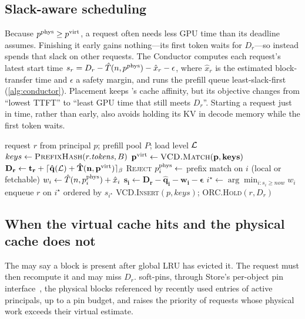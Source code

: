 \subsection{Slack-aware scheduling}
\label{sec:slack}
Because $p^{\mathrm{phys}} \ge p^{\mathrm{virt}}$, a request often needs less GPU time than its deadline
assumes. Finishing it early gains nothing---its first token waits for
$D_r$---so \sys instead spends that slack on other requests. The Conductor
computes each request's latest start time
$s_r = D_r - \hat{T}(n, p^{\mathrm{phys}}) - \hat{x}_r - \epsilon$, where $\hat{x}_r$ is the
estimated block-transfer time and $\epsilon$ a safety margin, and runs the
prefill queue least-slack-first (\cref{alg:conductor}). Placement keeps \mc's
cache affinity, but its objective changes from ``lowest TTFT'' to ``least GPU
time that still meets $D_r$''. Starting a request just in time, rather than
early, also avoids holding its KV in decode memory while the first token waits.

\begin{algorithm}[t]
\caption{\sys Conductor (changes to \mc's Algorithm~1 in \textbf{bold})}
\label{alg:conductor}
\small
\begin{algorithmic}[1]
\Require request $r$ from principal $p$; prefill pool $P$; load level $\mathcal{L}$
\State $keys \gets \textsc{PrefixHash}(r.\mathit{tokens}, B)$
\State $\mathbf{p^{\mathrm{virt}} \gets \textsc{VCD.Match}(p, keys)}$ 
\State $\mathbf{D_r \gets t_r + \lceil \hat{q}(\mathcal{L}) + \hat{T}(n,p^{\mathrm{virt}})\rceil_\beta}$
  \State \Return \textsc{Reject} 
\EndIf
{}
  \State $p^{\mathrm{phys}}_i \gets$ prefix match on $i$ (local or fetchable)
  \State $w_i \gets \hat{T}(n, p^{\mathrm{phys}}_i) + \hat{x}_i$ 
  \State $\mathbf{s_i \gets D_r - \hat{q}_i - w_i - \epsilon}$ 
\EndFor
\State $i^\star \gets \arg\min_{i : s_i \ge \mathit{now}} w_i$ 
\State enqueue $r$ on $i^\star$ ordered by $s_{i^\star}$ 
\State \textsc{VCD.Insert}$(p, keys)$; \textsc{ORC.Hold}$(r, D_r)$
\end{algorithmic}
\end{algorithm}

\subsection{When the virtual cache hits and the physical cache does not}
\label{sec:pinning}
The \vcd may say a block is present after global LRU has evicted it. The
request must then recompute it and may miss $D_r$. \sys soft-pins, through
\mc Store's per-object pin interface~\cite{mooncakerepo}, the physical blocks
referenced by recently used \vcd entries of active principals, up to a pin
budget, and raises the priority of requests whose physical work exceeds their
virtual estimate. 

